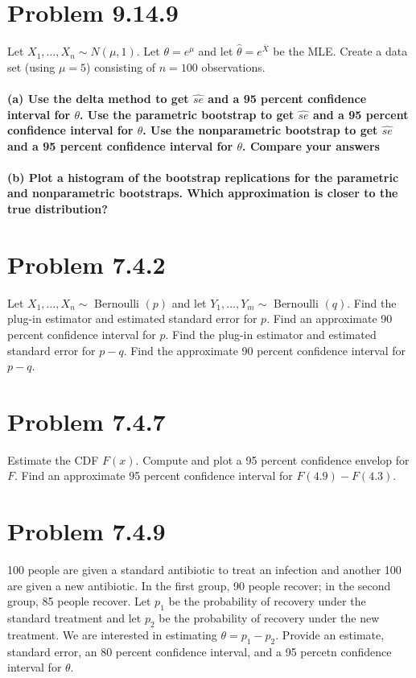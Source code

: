 \documentclass{article}\usepackage[]{graphicx}\usepackage[]{color}
\begin{document}
\section{Problem 9.14.9}
Let $X_{1}, \ldots, X_{n} \sim N(\mu,1)$. Let $\theta = e^{\mu}$ and let $\hat{\theta} = e^{\overline{X}}$ be the MLE. Create a data set (using $\mu = 5$) consisting of $n = 100$ observations. 

\paragraph*{(a) Use the delta method to get $\hat{se}$ and a 95 percent confidence interval for $\theta$. Use the parametric bootstrap to get $\hat{se}$ and a 95 percent confidence interval for $\theta$. Use the nonparametric bootstrap to get $\hat{se}$ and a 95 percent confidence interval for $\theta$. Compare your answers}

\paragraph*{(b) Plot a histogram of the bootstrap replications for the parametric and nonparametric bootstraps. Which approximation is closer to the true distribution?}


\section{Problem 7.4.2}
Let $X_{1}, \ldots, X_{n} \sim$ Bernoulli $(p)$ and let $Y_{1}, \ldots, Y_{m} \sim$ Bernoulli $(q)$. Find the plug-in estimator and estimated standard error for $p$. Find an approximate 90 percent confidence interval for $p$. Find the plug-in estimator and estimated standard error for $p - q$. Find the approximate 90 percent confidence interval for $p - q$. 




\section{Problem 7.4.7}
Estimate the CDF $F(x)$. Compute and plot a 95 percent confidence envelop for $F$. Find an approximate 95 percent confidence interval for $F(4.9) - F(4.3)$.




\section{Problem 7.4.9}
100 people are given a standard antibiotic to treat an infection and another 100 are given a new antibiotic. In the first group, 90 people recover; in the second group, 85 people recover. Let $p_{1}$ be the probability of recovery under the standard treatment and let $p_{2}$ be the probability of recovery under the new treatment. We are interested in estimating $\theta = p_{1} - p_{2}$. Provide an estimate, standard error, an 80 percent confidence interval, and a 95 percetn confidence interval for $\theta$.
\end{document}

